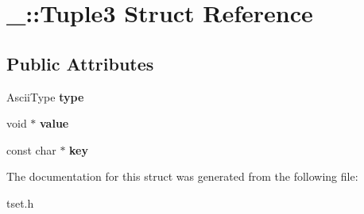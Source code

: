 \hypertarget{struct___1_1_tuple3}{}\section{\+\_\+\+:\+:Tuple3 Struct Reference}
\label{struct___1_1_tuple3}
\subsection*{Public Attributes}
\begin{DoxyCompactItemize}
\item 
\mbox{\label{struct___1_1_tuple3_aaab11ab3c99ea6c0128b27f96ffc4142}} 
Ascii\+Type {\bfseries type}
\item 
\mbox{\label{struct___1_1_tuple3_af55cbbd9bfbdde34c3768d5f319a3194}} 
void $\ast$ {\bfseries value}
\item 
\mbox{\label{struct___1_1_tuple3_aef8e292e2f9cd542d1f5c7c1cad889ff}} 
const char $\ast$ {\bfseries key}
\end{DoxyCompactItemize}


The documentation for this struct was generated from the following file\+:\begin{DoxyCompactItemize}
\item 
tset.\+h\end{DoxyCompactItemize}
